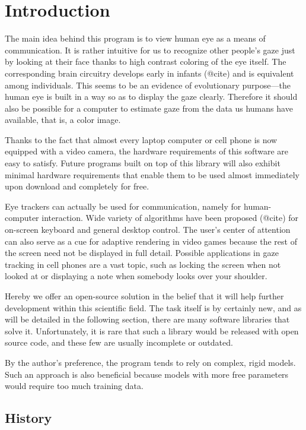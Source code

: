 \chapter{Introduction}

The main idea behind this program is to view human eye as a means of communication.
It is rather intuitive for us to recognize other people's gaze just by looking at their face thanks to high contrast coloring of the eye itself.
The corresponding brain circuitry develops early in infants (@cite) and is equivalent among individuals.
This seems to be an evidence of evolutionary purpose---the human eye is built in a way so as to display the gaze clearly.
Therefore it should also be possible for a computer to estimate gaze from the data us humans have available, that is, a color image.

Thanks to the fact that almost every laptop computer or cell phone is now equipped with a video camera, the hardware requirements of this software are easy to satisfy.
Future programs built on top of this library will also exhibit minimal hardware requirements that enable them to be used almost immediately upon download and completely for free.

Eye trackers can actually be used for communication, namely for human-computer interaction.
Wide variety of algorithms have been proposed (@cite) for on-screen keyboard and general desktop control.
The user's center of attention can also serve as a cue for adaptive rendering in video games because the rest of the screen need not be displayed in full detail.
Possible applications in gaze tracking in cell phones are a vast topic, such as locking the screen when not looked at or displaying a note when somebody looks over your shoulder.

Hereby we offer an open-source solution in the belief that it will help further development within this scientific field.
The task itself is by certainly new, and as will be detailed in the following section, there are many software libraries that solve it.
Unfortunately, it is rare that such a library would be released with open source code, and these few are usually incomplete or outdated.


By the author's preference, the program tends to rely on complex, rigid models.
Such an approach is also beneficial because models with more free parameters would require too much training data.

\section{History}

